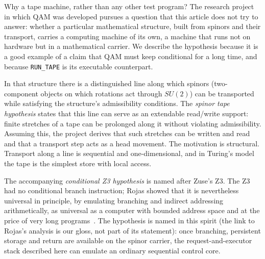 Why a tape machine, rather than any other test program? The research project in which QAM was developed pursues a question that this
article does not try to answer: whether a particular mathematical structure, built from spinors and their transport, carries a
computing machine of its own, a machine that runs not on hardware but in a mathematical carrier. We describe the hypothesis because it is
a good example of a claim that QAM must keep conditional for a long time, and because \texttt{RUN\_TAPE} is its executable counterpart.

In that structure there is a distinguished line along which spinors (two-component objects on which rotations act through $SU(2)$)
can be transported while satisfying the structure's admissibility conditions. The \emph{spinor tape hypothesis} states that this
line can serve as an extendable read/write support: finite stretches of a tape can be prolonged along
it without violating admissibility. Assuming this, the project derives that such stretches can be written and read and that a transport
step acts as a head movement. The motivation is structural. Transport along a line is
sequential and one-dimensional, and in Turing's model the tape is the simplest store with local access.

The accompanying \emph{conditional Z3 hypothesis} is named after Zuse's Z3. The Z3 had no conditional branch instruction; Rojas showed
that it is nevertheless universal in principle, by emulating branching and indirect addressing arithmetically, as universal as a computer
with bounded address space and at the price of very long programs~\cite{rojas98}. The hypothesis is named in this spirit (the link to Rojas's analysis is our gloss, not part of its statement): once branching,
persistent storage and return are available on the spinor carrier, the request-and-executor stack described here can emulate an
ordinary sequential control core.

